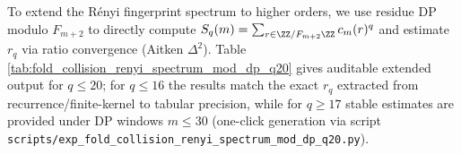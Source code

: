\begin{remark}[Extended fingerprints (auditable): \texorpdfstring{$r_q$}{rq} and \texorpdfstring{$h_q$}{hq} for \texorpdfstring{$q\le 20$}{q<=20}]\label{rem:pom-renyi-spectrum-q20}
To extend the Rényi fingerprint spectrum to higher orders, we use residue DP modulo \(F_{m+2}\) to directly compute
\(
S_q(m)=\sum_{r\in\ZZ/F_{m+2}\ZZ}c_m(r)^q
\)
and estimate \(r_q\) via ratio convergence (Aitken \(\Delta^2\)).
Table \ref{tab:fold_collision_renyi_spectrum_mod_dp_q20} gives auditable extended output for \(q\le 20\); for \(q\le 16\) the results match the exact \(r_q\) extracted from recurrence/finite-kernel to tabular precision, while for \(q\ge 17\) stable estimates are provided under DP windows \(m\le 30\) (one-click generation via script \texttt{scripts/exp\_fold\_collision\_renyi\_spectrum\_mod\_dp\_q20.py}).
\end{remark}

